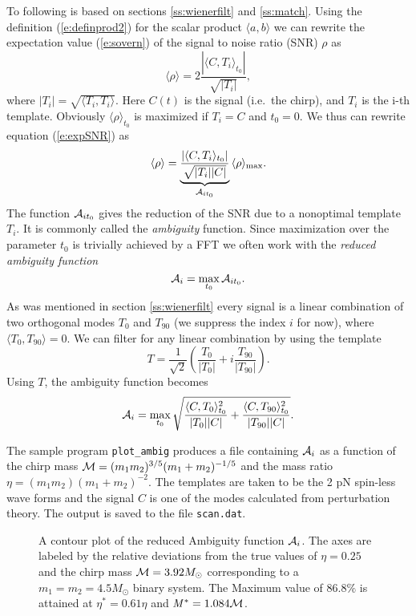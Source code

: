 To following is based on sections \ref{ss:wienerfilt} and \ref{ss:match}.
Using the definition (\ref{e:definprod2}) for the scalar product
$\langle a,b \rangle$ we can rewrite the expectation value (\ref{e:sovern}) of the signal to
noise ratio (SNR) $\rho$  as
\begin{equation}
  \langle \rho \rangle = 2 \frac{|\langle C, T_i \rangle_{t_0}|}{\sqrt{|T_i|}},
  \label{e:expSNR}
\end{equation}
where $|T_i| = \sqrt{\langle T_i, T_i \rangle}$.
Here ${C}(t)$ is the signal (i.e.~the chirp), and 
$T_i$ is the i-th template. Obviously $\langle \rho \rangle_{t_0}$ is maximized if
$T_i = C$ and $t_0 = 0$. We thus can rewrite equation (\ref{e:expSNR}) as
\[
    \langle \rho \rangle = 
	\underbrace{\frac{|\langle C, T_i \rangle_{t_0}|}{\sqrt{|T_i| | C |
	}}}_{{\cal A}_{i t_0}} \, \langle \rho
	\rangle_{\rm max}.
\]
The function ${\cal A}_{i t_0}$ gives the reduction of the SNR due to  a 
nonoptimal template $T_i$. It is commonly called the {\em ambiguity} function. Since
maximization over the parameter $t_0$ is trivially achieved by a FFT we often
work with the {\em reduced ambiguity function} 
\[
  {\cal A}_i = \max_{t_0} {\cal A}_{i t_0}.
\]
As was mentioned in section \ref{ss:wienerfilt} every signal is a linear
combination of two orthogonal modes $T_0$ and $T_{90}$ (we suppress the index $i$
for now), where $\langle T_0, T_{90} \rangle = 0$. 
We can filter for any linear combination by using the template 
\[
    T = \frac{1}{\sqrt{2}} \left( \frac{T_0}{|T_0|} + i \frac{T_{90}}{|T_{90}|}
	\right).
\]
Using $T$, the ambiguity function becomes
\begin{equation}
   {\cal A}_i = \max_{t_0} \sqrt{
     \frac{\langle C, T_0 \rangle^2_{t_0}}{|T_0| |C|} +
	 \frac{\langle C, T_{90} \rangle^2_{t_0}}{|T_{90}| |C|}}.
	 \label{e:ambiguity}
\end{equation}	

The sample program  {\tt plot\_ambig} produces a file containing ${\cal A}_i$ 
as a function of the chirp mass ${\cal M} = (m_1 m_2)^{3/5} (m_1+m_2)^{-1/5}$
and the mass ratio $\eta = (m_1 m_2) (m_1+m_2)^{-2}$. The templates are taken to
be the 2 pN spin-less wave forms and the signal $C$ is one of  the modes calculated from
perturbation theory. 
The output is saved to the file {\tt scan.dat}.

\begin{figure}[h]
\begin{center}
\caption{ \label{f:tmscan}
A contour plot of the reduced Ambiguity function ${\cal A}_i$. The axes are labeled by the relative
deviations from the true values of $\eta=0.25$ and the chirp mass ${\cal M}=3.92
M_\odot$ corresponding to a $m_1=m_2=4.5 M_\odot$ binary system. The Maximum value of $86.8\%$ is attained at $\eta^* = 0.61 \eta$ and 
${\it M}^* = 1.084 {\cal M}$.  }
\end{center}
\end{figure}

\clearpage

